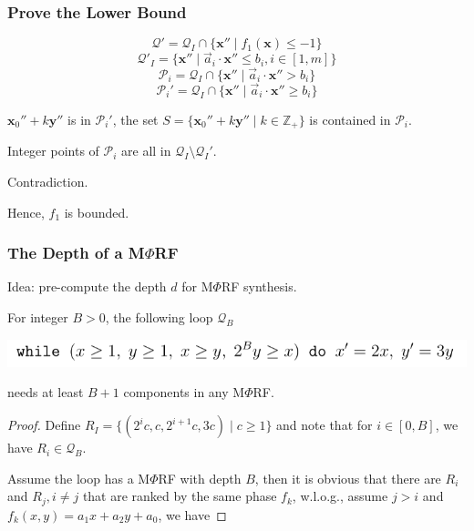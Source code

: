 \documentclass[11pt]{beamer}
\begin{document}
\begin{frame}\frametitle{Prove the Lower Bound}

\[\mathcal{Q}' = \mathcal{Q}_I\cap \{\textbf{x}''\mid f_1(\textbf{x}) \le -1\}\]
\[\mathcal{Q}'_I = \{\textbf{x}'' \mid \vec{a}_i\cdot \textbf{x}'' \le b_i, i \in [1, m]\}\]
\[\mathcal{P}_i = \mathcal{Q}_I \cap \{\textbf{x}''\mid \vec{a}_i \cdot \textbf{x}'' > b_i\}\]
\[\mathcal{P}_i' = \mathcal{Q}_I \cap \{\textbf{x}''\mid \vec{a}_i \cdot \textbf{x}'' \ge b_i\}\]

$\textbf{x}_0'' + k\textbf{y}''$ is in $\mathcal{P}_i'$, the set $S = \{\textbf{x}_0'' + k\textbf{y}''\mid k \in \mathbb{Z}_+\}$ is contained in $\mathcal{P}_i$.

Integer points of $\mathcal{P}_i$ are all in $\mathcal{Q}_I\setminus \mathcal{Q}_I'$.

Contradiction.

Hence, $f_1$ is bounded.
\end{frame}

\fi



\fi
\begin{frame}\frametitle{The Depth of a M$\Phi$RF}
Idea: pre-compute the depth $d$ for M$\Phi$RF synthesis.

\begin{theorem}[5]
For integer $B > 0$, the following loop $\mathcal{Q}_B$
\begin{center}
\includegraphics[scale=0.5]{5.PNG}
\end{center}
needs at least $B + 1$ components in any M$\Phi$RF.
\end{theorem}

\begin{proof}
Define $R_I = \{(2^ic, c, 2^{i+1}c, 3c) \mid c \ge 1 \}$ and note that for $i \in [0,B]$, we have $R_i \in \mathcal{Q}_B$. 

Assume the loop has a M$\Phi$RF with depth $B$, then it is obvious that there are $R_i$ and $R_j, i\ne j$ that are ranked by the same phase $f_k$, w.l.o.g., assume $j > i$ and $f_k(x, y) = a_1 x + a_2 y + a_0$, we have 
 
\end{proof}

\end{frame}
\end{document}
